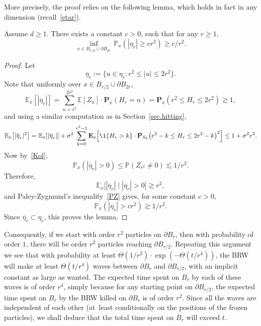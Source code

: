 More precisely, the proof relies on the following lemma, which holds in fact in any dimension (recall~\eqref{etar}).
\begin{lemma}\label{lem.inf.etar} Assume $d\ge 1$.
There exists a constant $c>0$, such that for any $r\ge 1$,
\[
\inf_{x\in B_{r/2}\cup \partial B_{2r}} \, \mathbb P_x(|\eta_r|\ge cr^2) \geq c/r^2.
\]
\end{lemma}

\begin{proof} Let
\[
\overline{\eta}_r := \{u\in \eta_r : r^2\le |u|\le 2r^2\}.
\]
Note that uniformly over $x\in B_{r/2} \cup \partial B_{2r}$,
\[
\mathbb E_x[|\overline{\eta}_r|] = \sum_{n=r^2}^{2r^2} \mathbb E[Z_n]
\cdot \mathbf P_x(H_r = n ) = \mathbf P_x(r^2\le H_r\le 2r^2 ) \gtrsim 1,
\]
and using a similar computation as in Section~\ref{sec.hitting},
\begin{equation*}
\mathbb E_x\big[|\overline{\eta}_r|^2\big] =
\mathbb E_x[|\overline{\eta}_r|] + \sigma^2\, \sum_{k=0}^{r^2-1}
\mathbf E_x\Big[\1\{H_r>k\}\cdot
\mathbf P_{S_k}\big(r^2-k\le H_r\le 2r^2-k\big)^2\Big] \le 1+\sigma^2 r^2.
\end{equation*}
Now by~\eqref{Kol},
\[
\mathbb P_x(|\overline{\eta}_r|>0 ) \le \mathbb P(Z_{r^2}\neq 0) \lesssim 1/r^2.
\]
Therefore,
\[
\mathbb E_x\big[|\overline{\eta}_r| \mid |\overline{\eta}_r|>0\big] \gtrsim r^2,
\]
and Paley-Zygmund's inequality~\eqref{PZ} gives, for some constant $c>0$,
\[
\mathbb P_x\left(|\overline{\eta}_r| > cr^2\right) \gtrsim 1/r^2.
\]
Since $\overline{\eta}_r\subset \eta_r$, this proves the lemma.
\end{proof}

Consequently, if we start with order $r^2$ particles on $\partial B_r$, then with probability of order $1$, there will be order $r^2$ particles reaching
$\partial B_{r/2}$. Repeating this argument we see that with probability at least
$\Theta(1/r^2) \cdot \exp(-\Theta(t/r^4))$, the BRW will
make at least $\Theta(t/r^4)$ waves between $\partial B_r$ and $\partial B_{r/2}$, with an implicit constant as large as wanted.
The expected time spent on $B_r$ by each of these waves is of
order $r^4$, simply because for any starting point on $\partial B_{r/2}$, the expected time spent on $B_r$ by the BRW killed on $\partial B_r$ is
of order $r^2$.
Since all the waves are independent of each other (at~least conditionally on the positions of the frozen particles), we shall deduce
that the total time spent on $B_r$ will exceed $t$.


